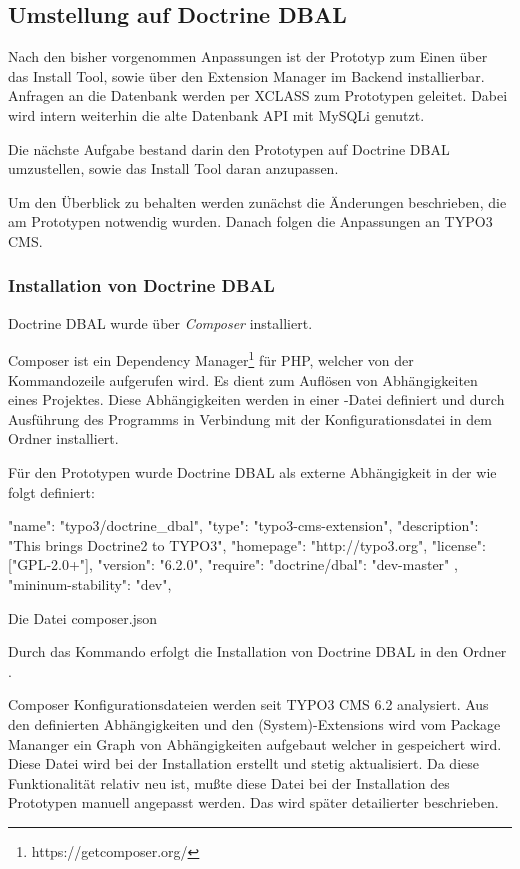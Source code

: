 \subsection{Umstellung auf Doctrine DBAL}
Nach den bisher vorgenommen Anpassungen ist der Prototyp zum Einen über das Install Tool, sowie über den Extension Manager im Backend installierbar. Anfragen an die Datenbank werden per XCLASS zum Prototypen geleitet. Dabei wird intern weiterhin die alte Datenbank API mit MySQLi genutzt.

Die nächste Aufgabe bestand darin den Prototypen auf Doctrine DBAL umzustellen, sowie das Install Tool daran anzupassen.

Um den Überblick zu behalten werden zunächst die Änderungen beschrieben, die am Prototypen notwendig wurden. Danach folgen die Anpassungen an TYPO3 CMS.

\subsubsection{Installation von Doctrine DBAL}
Doctrine DBAL wurde über \textit{Composer} installiert.

Composer ist ein Dependency Manager\footnote{https://getcomposer.org/} für PHP, welcher von der Kommandozeile aufgerufen wird. Es dient zum Auflösen von Abhängigkeiten eines Projektes. Diese Abhängigkeiten werden in einer -Datei definiert und durch Ausführung des Programms in Verbindung mit der Konfigurationsdatei in dem Ordner  installiert.

Für den Prototypen wurde Doctrine DBAL als externe Abhängigkeit in der  wie folgt definiert:

\begin{listing}
\begin{jsoncode}
{
	"name": "typo3/doctrine_dbal",
	"type": "typo3-cms-extension",
	"description": "This brings Doctrine2 to TYPO3",
	"homepage": "http://typo3.org",
	"license": ["GPL-2.0+"],
	"version": "6.2.0",
	"require": {
		"doctrine/dbal": "dev-master"
	},
	"mininum-stability": "dev",
}
\end{jsoncode}
\caption{Die Datei composer.json}
\label{lst:composer}
\end{listing}

Durch das Kommando  erfolgt die Installation von Doctrine DBAL in den Ordner .

Composer Konfigurationsdateien werden seit TYPO3 CMS 6.2 analysiert. Aus den definierten Abhängigkeiten und den (System)-Extensions wird vom Package Mananger ein Graph von Abhängigkeiten aufgebaut welcher in  gespeichert wird. Diese Datei wird bei der Installation erstellt und stetig aktualisiert. Da diese Funktionalität relativ neu ist, mußte diese Datei bei der Installation des Prototypen manuell angepasst werden. Das wird später detailierter beschrieben.


